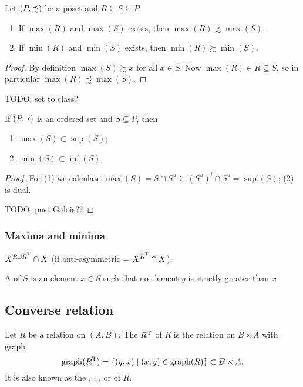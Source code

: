 \begin{lemma} \label{greatestLeastElementsSubsetPoset}
Let $\left( P, \precsim \right)$ be a poset and $R\subseteq S\subseteq P$.
\begin{enumerate}
\item If $\max(R)$ and $\max(S)$ exists, then $\max(R) \precsim \max(S)$.
\item If $\min(R)$ and $\min(S)$ exists, then $\min(R) \succsim \min(S)$.
\end{enumerate}
\end{lemma}
\begin{proof}
By definition $\max(S) \succsim x$ for all $x \in S$. Now $\max(R)\in R\subseteq S$, so in particular $\max(R) \precsim \max(S)$.
\end{proof}

TODO: set to class?
\begin{lemma} \label{maxSupMinInf}
If $\left( P, \Yleft \right)$ is an ordered set and $S\subseteq P$, then
\begin{enumerate}
\item $\max(S)\subset \sup(S)$;
\item $\min(S)\subset \inf(S)$.
\end{enumerate}
\end{lemma}
\begin{proof}
For (1) we calculate $\max(S) = S \cap S^u \subseteq (S^u)^l \cap S^u = \sup(S)$; (2) is dual.

TODO: post Galois??
\end{proof}

\subsubsection{Maxima and minima}
\begin{definition}
$X^{R\cup \overline{R}^{\mathrm{T}}}\cap X$ (if anti-asymmetric = $X^{\overline{R}^{\mathrm{T}}}\cap X$).

A  of $S$ is an element $x\in S$ such that no element $y$ is strictly greater than $x$
\end{definition}

\subsection{Converse relation}
\begin{definition}
Let $R$ be a relation on $(A, B)$. The  $R^{\mathrm{T}}$ of $R$ is the relation on $B\times A$ with graph
\[ \operatorname{graph}(R^{\mathrm{T}}) = \left\{ (y,x) \;\middle|\; (x,y)\in \operatorname{graph}(R) \right\} \subset B\times A. \]
It is also known as the , , ,  or  of $R$.
\end{definition}

